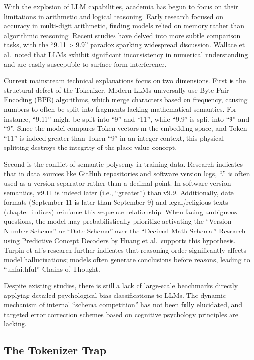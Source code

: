 With the explosion of LLM capabilities, academia has begun to focus on their limitations in arithmetic and logical reasoning. Early research focused on accuracy in multi-digit arithmetic, finding models relied on memory rather than algorithmic reasoning. Recent studies have delved into more subtle comparison tasks, with the “9.11 > 9.9” paradox sparking widespread discussion. Wallace et al. noted that LLMs exhibit significant inconsistency in numerical understanding and are easily susceptible to surface form interference\cite{wallace2019}.

Current mainstream technical explanations focus on two dimensions. First is the structural defect of the Tokenizer. Modern LLMs universally use Byte-Pair Encoding (BPE) algorithms, which merge characters based on frequency, causing numbers to often be split into fragments lacking mathematical semantics. For instance, “9.11” might be split into “9” and “11”, while “9.9” is split into “9” and “9”. Since the model compares Token vectors in the embedding space, and Token “11” is indeed greater than Token “9” in an integer context, this physical splitting destroys the integrity of the place-value concept\cite{singh2024}.

Second is the conflict of semantic polysemy in training data. Research indicates that in data sources like GitHub repositories and software version logs, “.” is often used as a version separator rather than a decimal point. In software version semantics, v9.11 is indeed later (i.e., “greater”) than v9.9. Additionally, date formats (September 11 is later than September 9) and legal/religious texts (chapter indices) reinforce this sequence relationship. When facing ambiguous questions, the model may probabilistically prioritize activating the “Version Number Schema” or “Date Schema” over the “Decimal Math Schema.” Research using Predictive Concept Decoders by Huang et al. supports this hypothesis\cite{huang2025}. Turpin et al.’s research further indicates that reasoning order significantly affects model hallucinations; models often generate conclusions before reasons, leading to “unfaithful” Chains of Thought\cite{turpin2023}.

Despite existing studies, there is still a lack of large-scale benchmarks directly applying detailed psychological bias classifications to LLMs. The dynamic mechanism of internal “schema competition” has not been fully elucidated, and targeted error correction schemes based on cognitive psychology principles are lacking.

\subsection{The Tokenizer Trap}

